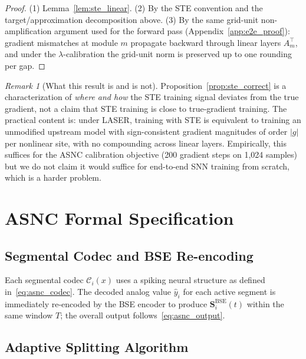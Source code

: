 \documentclass{article}
\theoremstyle{plain}
\theoremstyle{definition}
\theoremstyle{remark}
\newtheorem{remark}[theorem]{Remark}
\begin{document}
\begin{proof}
(1) Lemma~\ref{lem:ste_linear}.
(2) By the STE convention and the target/approximation decomposition above.
(3) By the same grid-unit non-amplification argument used for the forward
pass (Appendix~\ref{app:e2e_proof}): gradient mismatches at module $m$
propagate backward through linear layers $A_m^\top$, and under the
$\lambda$-calibration the grid-unit norm is preserved up to one rounding
per gap.
\end{proof}

\begin{remark}[What this result is and is not]
Proposition~\ref{prop:ste_correct} is a characterization of \emph{where and
how} the STE training signal deviates from the true gradient, not a claim
that STE training is close to true-gradient training. The practical content
is: under LASER, training with STE is equivalent to training an unmodified
upstream model with sign-consistent gradient magnitudes of order $|g|$ per
nonlinear site, with no compounding across linear layers. Empirically, this
suffices for the ASNC calibration objective (200 gradient steps on 1{,}024
samples) but we do not claim it would suffice for end-to-end SNN training
from scratch, which is a harder problem.
\end{remark}


\section{ASNC Formal Specification}
\label{app:asnc_details}

\subsection{Segmental Codec and BSE Re-encoding}

Each segmental codec $\mathcal{C}_i(x)$ uses a spiking neural structure as
defined in~\eqref{eq:asnc_codec}. The decoded analog value $\hat{y}_i$ for
each active segment is immediately re-encoded by the BSE encoder to produce
$\mathbf{S}^{\mathrm{BSE}}_i(t)$ within the same window $T$; the overall
output follows~\eqref{eq:asnc_output}.

\subsection{Adaptive Splitting Algorithm}
\end{document}
